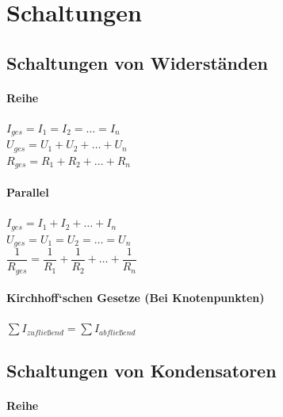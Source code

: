 \documentclass[a4paper]{article}
\begin{document}
\section{Schaltungen}
\subsection{Schaltungen von Widerständen}

\paragraph{Reihe}

\begin{center}
	\Large
		$I_{ges} = I_1 = I_2 = … = I_n$\\[0,5cm]
		$U_{ges} = U_1 + U_2 + … + U_n$\\[0,5cm]
		$R_{ges} = R_1 + R_2 + … + R_n$\\[1cm]
	\normalsize
\end{center}


\paragraph{Parallel}

\begin{center}
	\Large
		$I_{ges} = I_1 + I_2 + … + I_n$\\[0,5cm]
		$U_{ges} = U_1 = U_2 = … = U_n$\\[0,5cm]
		$\dfrac{1}{R_{ges}} = \dfrac{1}{R_1} + \dfrac{1}{R_2} + … + \dfrac{1}{R_n}$\\[1cm]
	\normalsize
\end{center}


\paragraph{Kirchhoff‘schen Gesetze (Bei Knotenpunkten)}

\begin{center}
    \Large 
        $\sum{I_{zufließend}} = \sum{I_{abfließend}}$\\[1cm]
    \normalsize
\end{center}



\subsection{Schaltungen von Kondensatoren}

\paragraph{Reihe}
\end{document}

